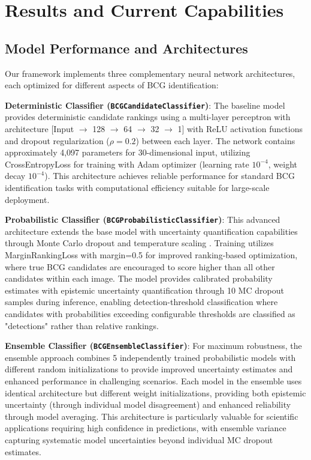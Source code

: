 \documentclass[twocolumn,10pt]{aastex631}
\begin{document}
\section{Results and Current Capabilities}

\subsection{Model Performance and Architectures}

Our framework implements three complementary neural network architectures, each optimized for different aspects of BCG identification:

\textbf{Deterministic Classifier (\texttt{BCGCandidateClassifier})}: The baseline model provides deterministic candidate rankings using a multi-layer perceptron with architecture [Input $\rightarrow$ 128 $\rightarrow$ 64 $\rightarrow$ 32 $\rightarrow$ 1] with ReLU activation functions and dropout regularization ($\rho = 0.2$) between each layer. The network contains approximately 4,097 parameters for 30-dimensional input, utilizing CrossEntropyLoss for training with Adam optimizer (learning rate $10^{-4}$, weight decay $10^{-4}$). This architecture achieves reliable performance for standard BCG identification tasks with computational efficiency suitable for large-scale deployment.

\textbf{Probabilistic Classifier (\texttt{BCGProbabilisticClassifier})}: This advanced architecture extends the base model with uncertainty quantification capabilities through Monte Carlo dropout \citep{Gal2016MCDropout} and temperature scaling \citep{Laves2019WellCalibratedMU}. Training utilizes MarginRankingLoss with margin=0.5 for improved ranking-based optimization, where true BCG candidates are encouraged to score higher than all other candidates within each image. The model provides calibrated probability estimates with epistemic uncertainty quantification through 10 MC dropout samples during inference, enabling detection-threshold classification where candidates with probabilities exceeding configurable thresholds are classified as "detections" rather than relative rankings.

\textbf{Ensemble Classifier (\texttt{BCGEnsembleClassifier})}: For maximum robustness, the ensemble approach combines 5 independently trained probabilistic models with different random initializations to provide improved uncertainty estimates and enhanced performance in challenging scenarios. Each model in the ensemble uses identical architecture but different weight initializations, providing both epistemic uncertainty (through individual model disagreement) and enhanced reliability through model averaging. This architecture is particularly valuable for scientific applications requiring high confidence in predictions, with ensemble variance capturing systematic model uncertainties beyond individual MC dropout estimates.
\end{document}
